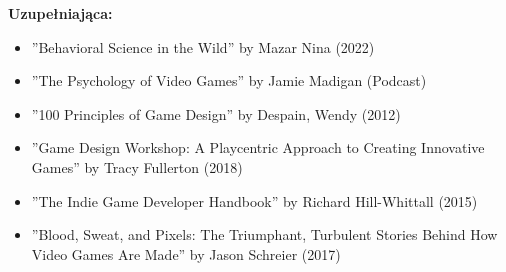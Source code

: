 \documentclass[12pt, a4paper]{article}
\begin{document}
\textbf{Uzupełniająca:}
\begin{itemize}
  \item ''Behavioral Science in the Wild'' by Mazar Nina (2022)
  \item ''The Psychology of Video Games'' by Jamie Madigan (Podcast)
  \item ''100 Principles of Game Design'' by Despain, Wendy (2012)
  \item ''Game Design Workshop: A Playcentric Approach to Creating Innovative Games'' by Tracy Fullerton (2018)
  \item ''The Indie Game Developer Handbook'' by Richard Hill-Whittall (2015)
  \item ''Blood, Sweat, and Pixels: The Triumphant, Turbulent Stories Behind How Video Games Are Made'' by Jason Schreier (2017)
\end{itemize}
\end{document}
